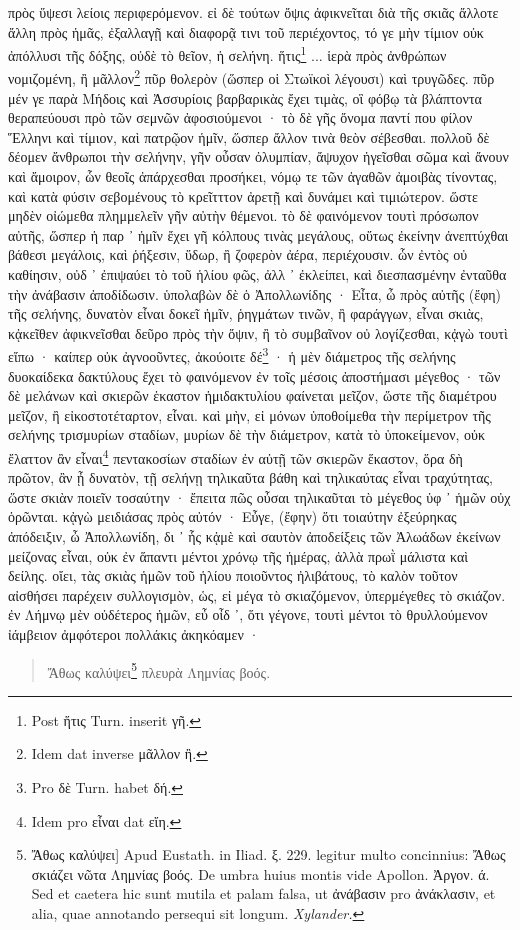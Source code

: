 \documentclass[a4paper, 11pt, oneside, polutonikogreek, german]{article}
\begin{document}
πρὸς ὕψεσι λείοις περιφερόμενον. εἰ δὲ τούτων ὄψις ἀφικνεῖται διὰ τῆς σκιᾶς ἄλλοτε ἄλλη πρὸς ἡμᾶς, ἐξαλλαγῇ καὶ διαφορᾷ τινι τοῦ περιέχοντος, τό γε μὴν τίμιον οὐκ ἀπόλλυσι τῆς δόξης, οὐδὲ τὸ θεῖον, ἡ σελήνη. ἥτις\footnote{Post ἥτις Turn. inserit γῆ.} ... ἱερὰ πρὸς ἀνθρώπων νομιζομένη, ἢ μᾶλλον\footnote{Idem dat inverse μᾶλλον ἢ.} πῦρ θολερὸν (ὥσπερ οἱ Στωϊκοὶ λέγουσι) καὶ τρυγῶδες. πῦρ μέν γε παρὰ Μήδοις καὶ Ἀσσυρίοις βαρβαρικὰς ἔχει τιμὰς, οἳ φόβῳ τὰ βλάπτοντα θεραπεύουσι πρὸ τῶν σεμνῶν ἀφοσιούμενοι · τὸ δὲ γῆς ὄνομα παντί που φίλον Ἕλληνι καὶ τίμιον, καὶ πατρῷον ἡμῖν, ὥσπερ ἄλλον τινὰ θεὸν σέβεσθαι. πολλοῦ δὲ δέομεν ἄνθρωποι τὴν σελήνην, γῆν οὖσαν ὀλυμπίαν, ἄψυχον ἡγεῖσθαι σῶμα καὶ ἄνουν καὶ ἄμοιρον, ὧν θεοῖς ἀπάρχεσθαι προσήκει, νόμῳ τε τῶν ἀγαθῶν ἀμοιβὰς τίνοντας, καὶ κατὰ φύσιν σεβομένους τὸ κρεῖτττον ἀρετῇ καὶ δυνάμει καὶ τιμιώτερον. ὥστε μηδὲν οἰώμεθα πλημμελεῖν γῆν αὐτὴν θέμενοι. τὸ δὲ φαινόμενον τουτὶ πρόσωπον αὐτῆς, ὥσπερ ἡ παρ ᾽ ἡμῖν ἔχει γῆ κόλπους τινὰς μεγάλους, οὕτως ἐκείνην ἀνεπτύχθαι βάθεσι μεγάλοις, καὶ ῥήξεσιν, ὕδωρ, ἢ ζοφερὸν ἀέρα, περιέχουσιν. ὧν ἐντὸς οὐ καθίησιν, οὐδ ᾽ ἐπιψαύει τὸ τοῦ ἡλίου φῶς, ἀλλ ᾽ ἐκλείπει, καὶ διεσπασμένην ἐνταῦθα τὴν ἀνάβασιν ἀποδίδωσιν. ὑπολαβὼν δὲ ὁ Ἀπολλωνίδης · Εἶτα, ὦ πρὸς αὐτῆς (ἔφη) τῆς σελήνης, δυνατὸν εἶναι δοκεῖ ἡμῖν, ῥηγμάτων τινῶν, ἢ φαράγγων, εἶναι σκιὰς, κᾀκεῖθεν ἀφικνεῖσθαι δεῦρο πρὸς τὴν ὄψιν, ἢ τὸ συμβαῖνον οὐ λογίζεσθαι, κᾀγὼ τουτὶ εἴπω · καίπερ οὐκ ἀγνοοῦντες, ἀκούοιτε δέ\footnote{Pro δὲ Turn. habet δή.} · ἡ μὲν διάμετρος τῆς σελήνης δυοκαίδεκα δακτύλους ἔχει τὸ φαινόμενον ἐν τοῖς μέσοις ἀποστήμασι μέγεθος · τῶν δὲ μελάνων καὶ σκιερῶν ἑκαστον ἡμιδακτυλίου φαίνεται μεῖζον, ὥστε τῆς διαμέτρου μεῖζον, ἢ εἰκοστοτέταρτον, εἶναι. καὶ μὴν, εἰ μόνων ὑποθοίμεθα τὴν περίμετρον τῆς σελήνης τρισμυρίων σταδίων, μυρίων δὲ τὴν διάμετρον, κατὰ τὸ ὑποκείμενον, οὐκ ἔλαττον ἂν εἶναι\footnote{Idem pro εἶναι dat εἴη.} πεντακοσίων σταδίων ἐν αὐτῇ τῶν σκιερῶν ἕκαστον, ὅρα δὴ πρῶτον, ἂν ᾖ δυνατὸν, τῇ σελήνῃ τηλικαῦτα βάθη καὶ τηλικαύτας εἶναι τραχύτητας, ὥστε σκιὰν ποιεῖν τοσαύτην · ἔπειτα πῶς οὖσαι τηλικαῦται τὸ μέγεθος ὑφ ᾽ ἡμῶν οὐχ ὁρῶνται. κᾀγὼ μειδιάσας πρὸς αὐτόν · Εὖγε, (ἔφην) ὅτι τοιαύτην ἐξεύρηκας ἀπόδειξιν, ὦ Ἀπολλωνίδη, δι ᾽ ἧς κᾀμὲ καὶ σαυτὸν ἀποδείξεις τῶν Ἀλωάδων ἐκείνων μείζονας εἶναι, οὐκ ἐν ἅπαντι μέντοι χρόνῳ τῆς ἡμέρας, ἀλλὰ πρωῒ μάλιστα καὶ δείλης. οἴει, τὰς σκιὰς ἡμῶν τοῦ ἡλίου ποιοῦντος ἠλιβάτους, τὸ καλὸν τοῦτον αἰσθήσει παρέχειν συλλογισμὸν, ὡς, εἰ μέγα τὸ σκιαζόμενον, ὑπερμέγεθες τὸ σκιάζον. ἐν Λήμνῳ μὲν οὐδέτερος ἡμῶν, εὖ οἶδ ᾽, ὅτι γέγονε, τουτὶ μέντοι τὸ θρυλλούμενον ἰάμβειον ἀμφότεροι πολλάκις ἀκηκόαμεν ·
\begin{quotation}
Ἄθως καλύψει\footnote{Ἄθως καλύψει] Apud Eustath. in Iliad. ξ. 229. legitur multo concinnius: Ἄθως σκιάζει νῶτα Λημνίας βοός. De umbra huius montis vide Apollon. Ἀργον. ά. Sed et caetera hic sunt mutila et palam falsa, ut ἀνάβασιν pro ἀνάκλασιν, et alia, quae annotando persequi sit longum. \emph{Xylander.}} πλευρὰ Λημνίας βοός.
\end{quotation}
\end{document}
